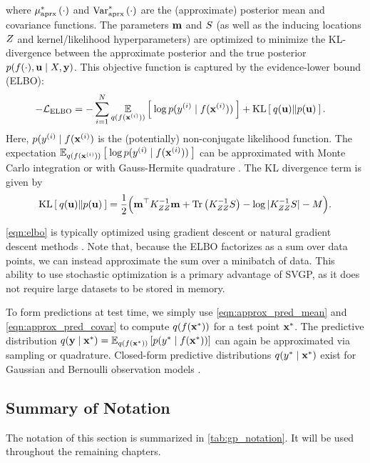 %
where $\mu^*_\text{aprx} \left( \cdot \right)$ and $\text{Var}^*_\text{aprx} \left( \cdot \right)$ are the (approximate) posterior mean and covariance functions.
The parameters $\mathbf{m}$ and $S$ (as well as the inducing locations $Z$ and kernel/likelihood hyperparameters) are optimized to minimize the KL-divergence between the approximate posterior and the true posterior $p(f(\cdot), \mathbf{u} \mid X, \mathbf{y})$.
This objective function is captured by the evidence-lower bound (ELBO):
%
\begin{align}
	-\mathcal L_\text{ELBO} &= -\sum_{i=1}^N \operatorname*{\mathbb{E}}_{q(f(\mathbf{x}^{(i)}))} \left[   \: \log p( y^{(i)} \mid f(\mathbf{x}^{(i)}) ) \:  \right] + \operatorname*{KL} \left[ \:  q(\mathbf{u})  \Vert  p(\mathbf{u})  \: \right].
	\label{eqn:elbo}
\end{align}
%
Here, $p(y^{(i)} \mid f(\mathbf{x}^{(i)})$ is the (potentially) non-conjugate likelihood function.
The expectation $\operatorname*{\mathbb{E}}_{q(f(\mathbf{x}^{(i)}))} \left[   \: \log p( y^{(i)} \mid f(\mathbf{x}^{(i)}) ) \:  \right]$ can be approximated with Monte Carlo integration \citep{wilson2016stochastic} or with Gauss-Hermite quadrature \cite{hensman2015scalable}.
The KL divergence term is given by
%
\[
	\kl{ q(\bu) }{ p(\bu) } = \frac{1}{2} \Bigl( \bm^\top \bK_{\bZ\bZ}^{-1} \bm + \tr{ \bK_{\bZ\bZ}^{-1} \bS } - \log \vert \bK_{\bZ\bZ}^{-1} \bS \vert - M \Bigr).
\]

\cref{eqn:elbo} is typically optimized using gradient descent or natural gradient descent methods \cite{hensman2012fast,salimbeni2018natural}.
Note that, because the ELBO factorizes as a sum over data points, we can instead approximate the sum over a minibatch of data.
This ability to use stochastic optimization is a primary advantage of SVGP, as it does not require large datasets to be stored in memory.

To form predictions at test time, we simply use \cref{eqn:approx_pred_mean} and \cref{eqn:approx_pred_covar} to compute $q(f(\mathbf{x}^*))$ for a test point $\mathbf{x}^*$.
The predictive distribution $q(\mathbf{y} \mid \mathbf{x}^*) = \operatorname*{\mathbb{E}}_{q(f(\mathbf{x}^*))} \left[  p(y^* \mid f(\mathbf{x}^*))  \right]$ can again be approximated via sampling or quadrature.
Closed-form predictive distributions $q(y^* \mid \mathbf{x}^*)$ exist for Gaussian and Bernoulli observation models \citep{rasmussen2006gaussian}.

\subsection{Summary of Notation}
The notation of this section is summarized in \cref{tab:gp_notation}.
It will be used throughout the remaining chapters.


